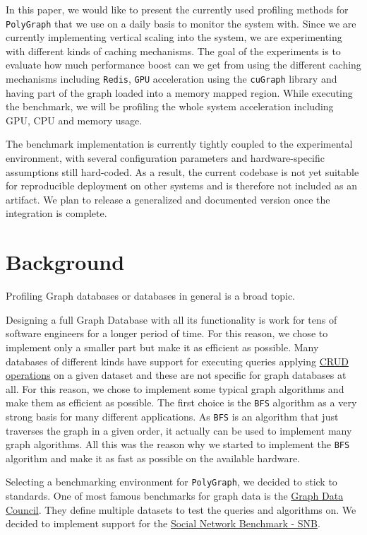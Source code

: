 \documentclass[11pt,a4paper]{article}
\begin{document}
In this paper, we would like to present the currently used profiling methods for \texttt{PolyGraph} that we use on a daily basis to monitor the system with. Since we are currently implementing vertical scaling into the system, we are experimenting with different kinds of caching mechanisms. The goal of the experiments is to evaluate how much performance boost can we get from using the different caching mechanisms including \texttt{Redis}, \texttt{GPU} acceleration using the \texttt{cuGraph} library and having part of the graph loaded into a memory mapped region. While executing the benchmark, we will be profiling the whole system acceleration including GPU, CPU and memory usage. 

The benchmark implementation is currently tightly coupled to the experimental environment, with several configuration parameters and hardware-specific assumptions still hard-coded. As a result, the current codebase is not yet suitable for reproducible deployment on other systems and is therefore not included as an artifact. We plan to release a generalized and documented version once the integration is complete.

\section{Background}

Profiling Graph databases or databases in general is a broad topic. 

Designing a full Graph Database with all its functionality is work for tens of software engineers for a longer period of time. For this reason, we chose to implement only a smaller part but make it as efficient as possible. Many databases of different kinds have support for executing queries applying \href{https://en.wikipedia.org/wiki/Create,_read,_update_and_delete}{CRUD operations} on a given dataset and these are not specific for graph databases at all. For this reason, we chose to implement some typical graph algorithms and make them as efficient as possible. The first choice is the \texttt{BFS} algorithm as a very strong basis for many different applications. As \texttt{BFS} is an algorithm that just traverses the graph in a given order, it actually can be used to implement many graph algorithms. All this was the reason why we started to implement the \texttt{BFS} algorithm and make it as fast as possible on the available hardware.

Selecting a benchmarking environment for \texttt{PolyGraph}, we decided to stick to standards. One of most famous benchmarks for graph data is the \href{https://ldbcouncil.org/}{Graph Data Council}. They define multiple datasets to test the queries and algorithms on. We decided to implement support for the \href{https://ldbcouncil.org/benchmarks/snb/}{Social Network Benchmark - SNB}.
\end{document}
